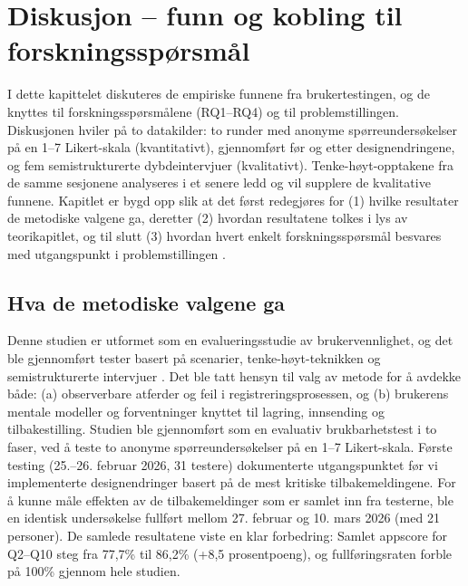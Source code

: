 \chapter{Diskusjon – funn og kobling til forskningsspørsmål}

I dette kapittelet diskuteres de empiriske funnene fra brukertestingen, og de knyttes til forskningsspørsmålene (RQ1–RQ4) og til problemstillingen. Diskusjonen hviler på to datakilder: to runder med anonyme spørreundersøkelser på en 1–7 Likert-skala (kvantitativt), gjennomført før og etter designendringene, og fem semistrukturerte dybdeintervjuer (kvalitativt). Tenke-høyt-opptakene fra de samme sesjonene analyseres i et senere ledd og vil supplere de kvalitative funnene. Kapitlet er bygd opp slik at det først redegjøres for (1) hvilke resultater de metodiske valgene ga, deretter (2) hvordan resultatene tolkes i lys av teorikapitlet, og til slutt (3) hvordan hvert enkelt forskningsspørsmål besvares med utgangspunkt i problemstillingen \cite{weichbroth2024,ericsson1993,braun2006}.
\newline 

\section{Hva de metodiske valgene ga}
Denne studien er utformet som en evalueringsstudie av brukervennlighet, og det ble gjennomført tester basert på scenarier, tenke-høyt-teknikken og semistrukturerte intervjuer \cite{weichbroth2024,ericsson1993}. Det ble tatt hensyn til valg av metode for å avdekke både:
(a) observerbare atferder og feil i registreringsprosessen, og
(b) brukerens mentale modeller og forventninger knyttet til lagring, innsending og tilbakestilling.
\newline
Studien ble gjennomført som en evaluativ brukbarhetstest i to faser, ved å teste to anonyme spørreundersøkelser på en 1–7 Likert-skala. Første testing (25.–26. februar 2026, 31 testere) dokumenterte utgangspunktet før vi implementerte designendringer basert på de mest kritiske tilbakemeldingene. For å kunne måle effekten av de tilbakemeldinger som er samlet inn fra testerne, ble en identisk undersøkelse fullført mellom 27. februar og 10. mars 2026 (med 21 personer). De samlede resultatene viste en klar forbedring: Samlet appscore for Q2–Q10 steg fra 77,7\% til 86,2\% (+8,5 prosentpoeng), og fullføringsraten forble på 100\% gjennom hele studien.

